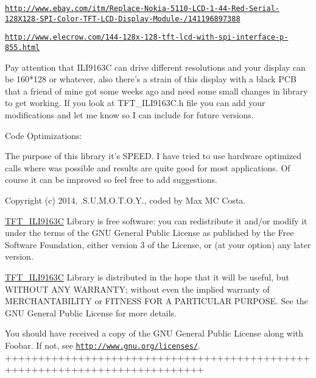 \href{http://www.ebay.com/itm/Replace-Nokia-5110-LCD-1-44-Red-Serial-128X128-SPI-Color-TFT-LCD-Display-Module-/141196897388}{\tt http\+://www.\+ebay.\+com/itm/\+Replace-\/\+Nokia-\/5110-\/\+L\+C\+D-\/1-\/44-\/\+Red-\/\+Serial-\/128\+X128-\/\+S\+P\+I-\/\+Color-\/\+T\+F\+T-\/\+L\+C\+D-\/\+Display-\/\+Module-\//141196897388}

\href{http://www.elecrow.com/144-128x-128-tft-lcd-with-spi-interface-p-855.html}{\tt http\+://www.\+elecrow.\+com/144-\/128x-\/128-\/tft-\/lcd-\/with-\/spi-\/interface-\/p-\/855.\+html} \begin{DoxyVerb}Pay attention that ILI9163C can drive different resolutions and your display can be
160*128 or whatever, also there's a strain of this display with a black PCB that a friend of mine
got some weeks ago and need some small changes in library to get working.
If you look at TFT_ILI9163C.h file you can add your modifications and let me know so I
can include for future versions.
\end{DoxyVerb}


Code Optimizations\+: \begin{DoxyVerb}The purpose of this library it's SPEED. I have tried to use hardware optimized calls
where was possible and results are quite good for most applications.
Of course it can be improved so feel free to add suggestions.
\end{DoxyVerb}
 

 Copyright (c) 2014, .S.\+U.\+M.\+O.\+T.\+O.\+Y., coded by Max M\+C Costa.

\hyperlink{class_t_f_t___i_l_i9163_c}{T\+F\+T\+\_\+\+I\+L\+I9163\+C} Library is free software\+: you can redistribute it and/or modify it under the terms of the G\+N\+U General Public License as published by the Free Software Foundation, either version 3 of the License, or (at your option) any later version.

\hyperlink{class_t_f_t___i_l_i9163_c}{T\+F\+T\+\_\+\+I\+L\+I9163\+C} Library is distributed in the hope that it will be useful, but W\+I\+T\+H\+O\+U\+T A\+N\+Y W\+A\+R\+R\+A\+N\+T\+Y; without even the implied warranty of M\+E\+R\+C\+H\+A\+N\+T\+A\+B\+I\+L\+I\+T\+Y or F\+I\+T\+N\+E\+S\+S F\+O\+R A P\+A\+R\+T\+I\+C\+U\+L\+A\+R P\+U\+R\+P\+O\+S\+E. See the G\+N\+U General Public License for more details.

You should have received a copy of the G\+N\+U General Public License along with Foobar. If not, see \href{http://www.gnu.org/licenses/}{\tt http\+://www.\+gnu.\+org/licenses/}. ++++++++++++++++++++++++++++++++++++++++++++++++++++++++++++++++++++++++++++

